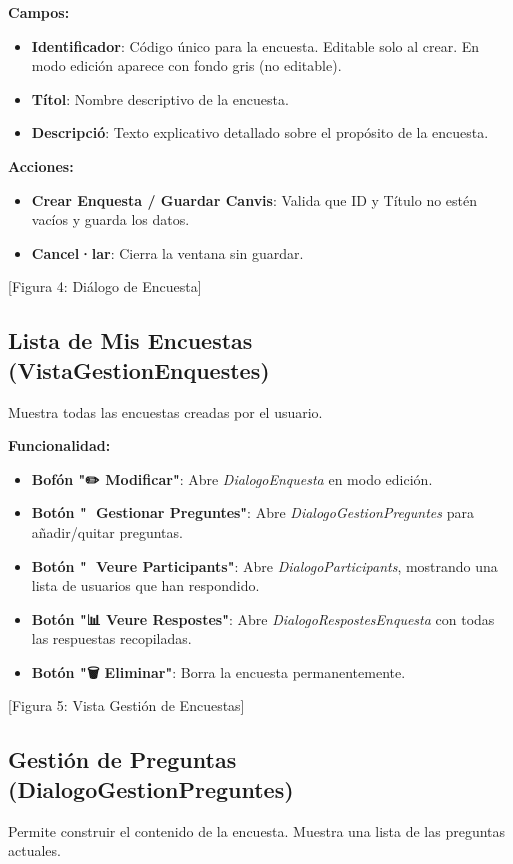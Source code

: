 \documentclass[a4paper,12pt]{article}
\begin{document}
\textbf{Campos:}
\begin{itemize}
    \item \textbf{Identificador}: Código único para la encuesta. Editable solo al crear. En modo edición aparece con fondo gris (no editable).
    \item \textbf{Títol}: Nombre descriptivo de la encuesta.
    \item \textbf{Descripció}: Texto explicativo detallado sobre el propósito de la encuesta.
\end{itemize}

\textbf{Acciones:}
\begin{itemize}
    \item \textbf{Crear Enquesta / Guardar Canvis}: Valida que ID y Título no estén vacíos y guarda los datos.
    \item \textbf{Cancel·lar}: Cierra la ventana sin guardar.
\end{itemize}
[Figura 4: Diálogo de Encuesta]

\subsection{Lista de Mis Encuestas (VistaGestionEnquestes)}
Muestra todas las encuestas creadas por el usuario.

\textbf{Funcionalidad:}
\begin{itemize}
    \item \textbf{Bofón "✏️ Modificar"}: Abre \textit{DialogoEnquesta} en modo edición.
    \item \textbf{Botón "📝 Gestionar Preguntes"}: Abre \textit{DialogoGestionPreguntes} para añadir/quitar preguntas.
    \item \textbf{Botón "👥 Veure Participants"}: Abre \textit{DialogoParticipants}, mostrando una lista de usuarios que han respondido.
    \item \textbf{Botón "📊 Veure Respostes"}: Abre \textit{DialogoRespostesEnquesta} con todas las respuestas recopiladas.
    \item \textbf{Botón "🗑️ Eliminar"}: Borra la encuesta permanentemente.
\end{itemize}
[Figura 5: Vista Gestión de Encuestas]

\subsection{Gestión de Preguntas (DialogoGestionPreguntes)}
Permite construir el contenido de la encuesta. Muestra una lista de las preguntas actuales.
\end{document}
